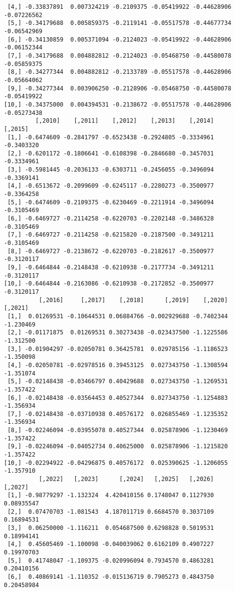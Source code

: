 \documentclass[
  letterpaper,
  DIV=11,
  numbers=noendperiod]{scrreprt}
\begin{document}
\begin{verbatim}
 [4,] -0.33837891  0.007324219 -0.2109375 -0.05419922 -0.44628906 -0.07226562
 [5,] -0.34179688  0.005859375 -0.2119141 -0.05517578 -0.44677734 -0.06542969
 [6,] -0.34130859  0.005371094 -0.2124023 -0.05419922 -0.44628906 -0.06152344
 [7,] -0.34179688  0.004882812 -0.2124023 -0.05468750 -0.44580078 -0.05859375
 [8,] -0.34277344  0.004882812 -0.2133789 -0.05517578 -0.44628906 -0.05664062
 [9,] -0.34277344  0.003906250 -0.2128906 -0.05468750 -0.44580078 -0.05419922
[10,] -0.34375000  0.004394531 -0.2138672 -0.05517578 -0.44628906 -0.05273438
         [,2010]    [,2011]    [,2012]    [,2013]    [,2014]    [,2015]
 [1,] -0.6474609 -0.2841797 -0.6523438 -0.2924805 -0.3334961 -0.3403320
 [2,] -0.6201172 -0.1806641 -0.6108398 -0.2846680 -0.3457031 -0.3334961
 [3,] -0.5981445 -0.2036133 -0.6303711 -0.2456055 -0.3496094 -0.3369141
 [4,] -0.6513672 -0.2099609 -0.6245117 -0.2280273 -0.3500977 -0.3364258
 [5,] -0.6474609 -0.2109375 -0.6230469 -0.2211914 -0.3496094 -0.3105469
 [6,] -0.6469727 -0.2114258 -0.6220703 -0.2202148 -0.3486328 -0.3105469
 [7,] -0.6469727 -0.2114258 -0.6215820 -0.2187500 -0.3491211 -0.3105469
 [8,] -0.6469727 -0.2138672 -0.6220703 -0.2182617 -0.3500977 -0.3120117
 [9,] -0.6464844 -0.2148438 -0.6210938 -0.2177734 -0.3491211 -0.3120117
[10,] -0.6464844 -0.2163086 -0.6210938 -0.2172852 -0.3500977 -0.3120117
          [,2016]     [,2017]    [,2018]      [,2019]    [,2020]   [,2021]
 [1,]  0.01269531 -0.10644531 0.06884766 -0.002929688 -0.7402344 -1.230469
 [2,] -0.01171875  0.01269531 0.30273438 -0.023437500 -1.1225586 -1.312500
 [3,] -0.01904297 -0.02050781 0.36425781  0.029785156 -1.1186523 -1.350098
 [4,] -0.02050781 -0.02978516 0.39453125  0.027343750 -1.1308594 -1.351074
 [5,] -0.02148438 -0.03466797 0.40429688  0.027343750 -1.1269531 -1.357422
 [6,] -0.02148438 -0.03564453 0.40527344  0.027343750 -1.1254883 -1.356934
 [7,] -0.02148438 -0.03710938 0.40576172  0.026855469 -1.1235352 -1.356934
 [8,] -0.02246094 -0.03955078 0.40527344  0.025878906 -1.1230469 -1.357422
 [9,] -0.02246094 -0.04052734 0.40625000  0.025878906 -1.1215820 -1.357422
[10,] -0.02294922 -0.04296875 0.40576172  0.025390625 -1.1206055 -1.357910
          [,2022]   [,2023]      [,2024]   [,2025]   [,2026]    [,2027]
 [1,] -0.98779297 -1.132324  4.420410156 0.1748047 0.1127930 0.08935547
 [2,]  0.07470703 -1.081543  4.187011719 0.6684570 0.3037109 0.16894531
 [3,]  0.06250000 -1.116211  0.054687500 0.6298828 0.5019531 0.18994141
 [4,]  0.45605469 -1.100098 -0.040039062 0.6162109 0.4907227 0.19970703
 [5,]  0.41748047 -1.109375 -0.020996094 0.7934570 0.4863281 0.20410156
 [6,]  0.40869141 -1.110352 -0.015136719 0.7905273 0.4843750 0.20458984

\end{verbatim}
\end{document}
